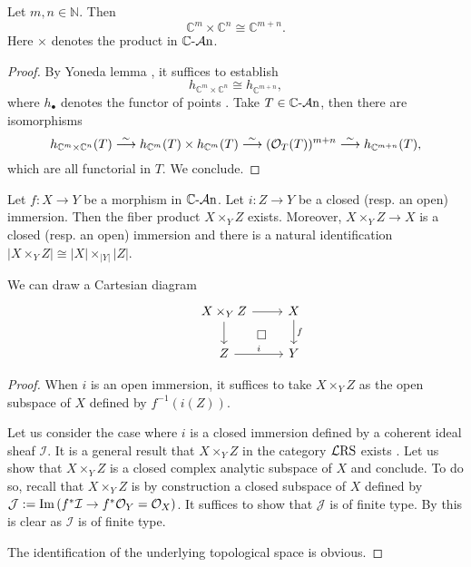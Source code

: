 \begin{lemma}\label{lma-CmCnproductexist}
Let $m,n\in \mathbb{N}$. Then 
\[
    \mathbb{C}^m\times \mathbb{C}^n\cong \mathbb{C}^{m+n}. 
\]    
Here $\times$ denotes the product in $\mathbb{C}\text{-}\mathcal{A}\mathrm{n}$.
\end{lemma}
\begin{proof}
    By Yoneda lemma \cite[\href{https://stacks.math.columbia.edu/tag/001P}{Tag 001P}]{stacks-project}, it suffices to establish
    \[
        h_{\mathbb{C}^m\times \mathbb{C}^n}\cong h_{\mathbb{C}^{m+n}},
    \]
    where $h_{\bullet}$ denotes the functor of points \cite[\href{https://stacks.math.columbia.edu/tag/001O}{Tag 001O}]{stacks-project}. Take $T\in \mathbb{C}\text{-}\mathcal{A}\mathrm{n}$, then there are isomorphisms
    \[
        h_{\mathbb{C}^m\times \mathbb{C}^n}(T)\stackrel{\sim}{\longrightarrow} h_{\mathbb{C}^m}(T)\times h_{\mathbb{C}^m}(T)\stackrel{\sim}{\longrightarrow} (\mathcal{O}_{T}(T))^{m+n}\stackrel{\sim}{\longrightarrow}   h_{\mathbb{C}^{m+n}}(T),
    \]
    which are all functorial in $T$. We conclude.
\end{proof}

\begin{lemma}\label{lma-existfiberproductimmersion}
    Let $f:X\rightarrow Y$ be a morphism in $\mathbb{C}\text{-}\mathcal{A}\mathrm{n}$. Let $i:Z\rightarrow Y$ be a closed (resp. an open) immersion. Then the fiber product $X\times_Y Z$ exists. Moreover, $X\times_Y Z\rightarrow X$ is a closed (resp. an open) immersion and there is a natural identification $|X\times_Y Z|\cong |X|\times_{|Y|}|Z|$.
\end{lemma}
We can draw a Cartesian diagram
\[
    \begin{tikzcd}
        & X\times_Y Z \arrow[r]\arrow[d]\arrow[rd,"\square",phantom] & X \arrow[d,"f"]\\
        & Z  \arrow[r,"i"] & Y
    \end{tikzcd}
\]
\begin{proof}
    When $i$ is an open immersion, it suffices to take $X\times_Y Z$ as the open subspace of $X$ defined by $f^{-1}(i(Z))$.

    Let us consider the case where $i$ is a closed immersion defined by a coherent ideal sheaf $\mathcal{I}$. It is a general result that $X\times_Y Z$ in the category $\mathcal{L}\mathrm{RS}$ exists \cite[\href{https://stacks.math.columbia.edu/tag/01HQ}{Tag 01HQ}]{stacks-project}. Let us show that $X\times_Y Z$ is a closed complex analytic subspace of $X$ and conclude. To do so, recall that $X\times_Y Z$ is by construction a closed subspace of $X$ defined by $\mathcal{J}:=\operatorname{Im} \left(f^*\mathcal{I}\rightarrow f^*\mathcal{O}_Y=\mathcal{O}_X\right)$. It suffices to show that $\mathcal{J}$ is of finite type. By this is clear as $\mathcal{I}$ is of finite type.

    The identification of the underlying topological space is obvious.
\end{proof}


